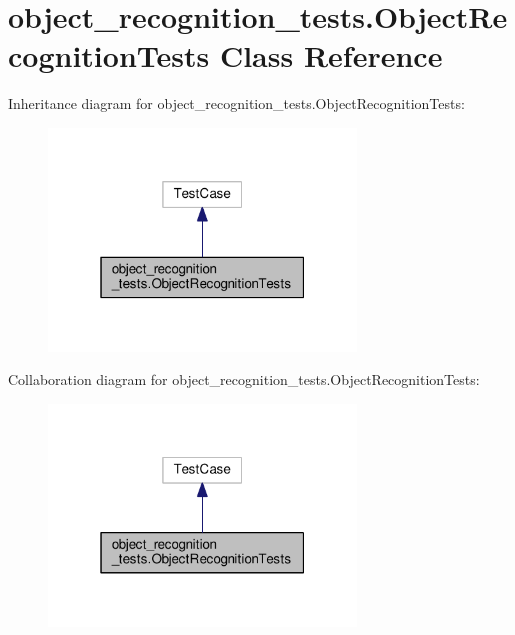 \hypertarget{classobject__recognition__tests_1_1ObjectRecognitionTests}{\section{object\-\_\-recognition\-\_\-tests.\-Object\-Recognition\-Tests Class Reference}
\label{classobject__recognition__tests_1_1ObjectRecognitionTests}
}


Inheritance diagram for object\-\_\-recognition\-\_\-tests.\-Object\-Recognition\-Tests\-:
\nopagebreak
\begin{figure}[H]
\begin{center}
\leavevmode
\includegraphics[width=232pt]{classobject__recognition__tests_1_1ObjectRecognitionTests__inherit__graph}
\end{center}
\end{figure}


Collaboration diagram for object\-\_\-recognition\-\_\-tests.\-Object\-Recognition\-Tests\-:
\nopagebreak
\begin{figure}[H]
\begin{center}
\leavevmode
\includegraphics[width=232pt]{classobject__recognition__tests_1_1ObjectRecognitionTests__coll__graph}
\end{center}
\end{figure}
